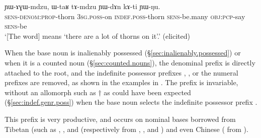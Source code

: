 \begin{exe}
\ex \label{ex:YAGWmdzu.def}
\gll ɲɯ-ɤɣɯ-mdzu, ɯ-taʁ tɤ-mdzu ɲɯ-dɤn kɤ-ti ɲɯ-ŋu. \\
\textsc{sens}-\textsc{denom}:\textsc{prop}-thorn \textsc{3sg}.\textsc{poss}-on \textsc{indef}.\textsc{poss}-thorn \textsc{sens}-be.many \textsc{obj}:\textsc{pcp}-say \textsc{sens}-be  \\
\glt `[The word]  means `there are a lot of thorns on it'.' (elicited)
\end{exe}

When the base noun is inalienably possessed (§\ref{sec:inalienably.possessed}) or when it is a counted noun (§\ref{sec:counted.nouns}), the denominal prefix is directly attached to the root, and the indefinite possessor prefixes , ,  or the numeral prefixes are removed, as shown in the examples in .  The  prefix is invariable, without an allomorph such as $\dagger$ as could have been expected (§\ref{sec:indef.genr.poss}) when the base noun selects the indefinite possessor prefix  .

This prefix is very productive, and occurs on nominal bases borrowed from Tibetan (such as , ,  and  (respectively from , ,  and  ) and even Chinese (	from ).

